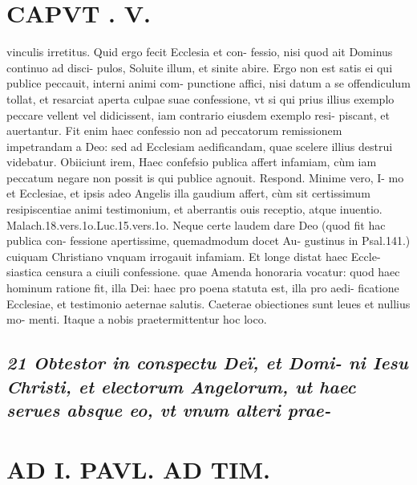 \documentclass{article}
\begin{document}
\begin{pages}
\section*{CAPVT . V. }
\marginpar{[ p.227 ]}\pstart vinculis irretitus. Quid ergo fecit Ecclesia et con- fessio, nisi quod ait Dominus continuo ad disci- pulos, Soluite illum, et sinite abire. Ergo non est satis ei qui publice peccauit, interni animi com- punctione affici, nisi datum a se offendiculum tollat, et resarciat aperta culpae suae confessione, vt si qui prius illius exemplo peccare vellent vel didicissent, iam contrario eiusdem exemplo resi- piscant, et auertantur. Fit enim haec confessio non ad peccatorum remissionem impetrandam a Deo: sed ad Ecclesiam aedificandam, quae scelere illius destrui videbatur.  \pend\pstart Obiiciunt irem, Haec confefsio publica affert infamiam, cùm iam peccatum negare non possit is qui publice agnouit. Respond. Minime vero, I- mo et Ecclesiae, et ipsis adeo Angelis illa gaudium affert, cùm sit certissimum resipiscentiae animi testimonium, et aberrantis ouis receptio, atque inuentio. Malach.18.vers.1o.Luc.15.vers.1o. Neque  certe laudem dare Deo (quod fit hac publica con- fessione apertissime, quemadmodum docet Au- gustinus in Psal.141.) cuiquam Christiano vnquam irrogauit infamiam. Et longe distat haec Eccle- siastica censura a ciuili confessione. quae Amenda honoraria vocatur: quod haec hominum ratione fit, illa Dei: haec pro poena statuta est, illa pro aedi- ficatione Ecclesiae, et testimonio aeternae salutis.  \pend\pstart Caeterae obiectiones sunt leues et nullius mo- menti. Itaque a nobis praetermittentur hoc loco.  \pend
{}
{}
\subsection*{\textit{21 Obtestor in conspectu Deï, et Domi- ni Iesu Christi, et electorum Angelorum, ut haec serues absque eo, vt vnum alteri prae- }}
\section*{AD I. PAVL. AD TIM. }
\marginpar{[ p.828 ]}
{}

\end{pages}
\end{document}
